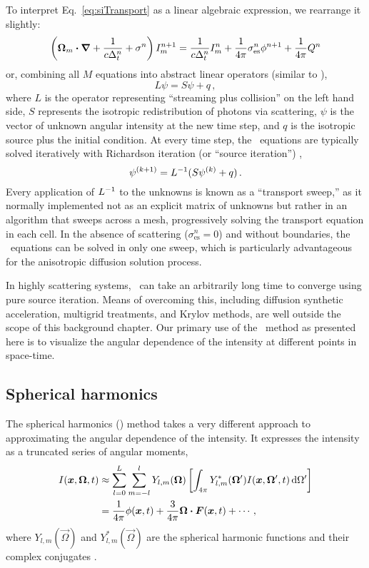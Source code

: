 To interpret Eq.~\eqref{eq:siTransport} as a linear algebraic expression, we
rearrange it slightly:
\begin{equation*}
  \left( \bm{\Omega}_{m} \bm{\cdot} \bm{\nabla} + \frac{1}{c\Delta_t^n}
  + \sigma^n \right) I_{m}^{n+1}
  = \frac{1}{c\Delta_t^n} I_{m}^n
  + \frac{1}{4\pi} \sigma_\mathrm{es}^n \phi^{n+1}
  + \frac{1}{4\pi} Q^n
\end{equation*}
or, combining all $M$ equations into abstract linear operators (similar to
\cite{War2004}),
\begin{equation*}
  L \psi = S \psi + q\,,
\end{equation*}
where $L$ is the operator representing ``streaming plus collision'' on the left
hand side, $S$ represents the isotropic redistribution of photons via
scattering, $\psi$ is the vector of unknown angular intensity at the new time
step, and $q$ is the isotropic source plus the initial condition. At every time
step, the \SN\ equations are typically solved iteratively with Richardson
iteration (or ``source iteration'') \cite{Lew1984},
\begin{equation*}
  \psi^{(k+1)} = L^{-1} ( S \psi^{(k)} + q )\,.
\end{equation*}
Every application of $L^{-1}$ to the unknowns is known as a ``transport sweep,''
as it normally implemented not as an explicit matrix of unknowns but rather in
an algorithm that sweeps across a mesh, progressively solving the transport
equation in each cell.
In the absence of scattering ($\sigma_\mathrm{es}^n=0$) and without boundaries,
the \SN\ equations can be solved in only one sweep, which is particularly
advantageous for the anisotropic diffusion solution process.

In highly scattering systems, \SN\ can take an arbitrarily long time to converge
using pure source iteration. Means of overcoming this, including diffusion
synthetic acceleration, multigrid treatments, and Krylov methods, are well
outside the scope of this background chapter. Our primary use of the \SN\ method
as presented here is to visualize the angular dependence of the intensity at
different points in space-time.

\subsection{Spherical harmonics}\label{sec:bgPn}
The spherical harmonics (\PN) method takes a very different approach to
approximating the angular dependence of the intensity. It expresses the
intensity as a truncated series of angular moments,
\begin{align*}
  I(\bm{x},\bm{\Omega},t)
  &\approx \sum_{l=0}^{L} \sum_{m=-l}^{l} Y_{l,m}(\bm{\Omega}) \left[
  \int_{4\pi} Y_{l,m}^\ast(\bm{\Omega}') I(\bm{x},\bm{\Omega}',t) \mathop{}\!\mathrm{d} \Omega'
  \right]
  \\
  &= \frac{1}{4\pi} \phi(\bm{x}, t) + \frac{3}{4\pi} \bm{\Omega}\bm{\cdot}
  \bm{F}(\bm{x},t) + \cdots\,,
\end{align*}
where $Y_{l,m}(\vec{\Omega})$ and $Y_{l,m}^*(\vec{\Omega})$ are the spherical
harmonic functions and their complex conjugates \cite{McC2008a,Lar2007}.


